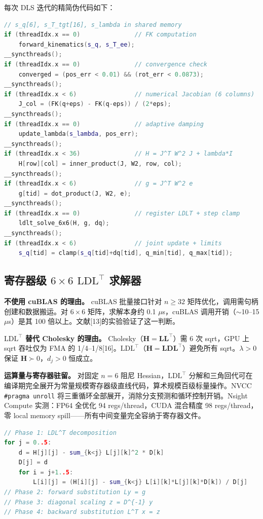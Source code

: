 \documentclass[twocolumn,a4paper,10pt]{ctexart}
\begin{document}
每次 DLS 迭代的精简伪代码如下：

\begin{lstlisting}[language=C++, caption={DLS单次迭代伪代码（per-block，128线程）}]
// s_q[6], s_T_tgt[16], s_lambda in shared memory
if (threadIdx.x == 0)               // FK computation
    forward_kinematics(s_q, s_T_ee);
__syncthreads();
if (threadIdx.x == 0)               // convergence check
    converged = (pos_err < 0.01) && (rot_err < 0.0873);
__syncthreads();
if (threadIdx.x < 6)                // numerical Jacobian (6 columns)
    J_col = (FK(q+eps) - FK(q-eps)) / (2*eps);
__syncthreads();
if (threadIdx.x == 0)               // adaptive damping
    update_lambda(s_lambda, pos_err);
__syncthreads();
if (threadIdx.x < 36)               // H = J^T W^2 J + lambda*I
    H[row][col] = inner_product(J, W2, row, col);
__syncthreads();
if (threadIdx.x < 6)                // g = J^T W^2 e
    g[tid] = dot_product(J, W2, e);
__syncthreads();
if (threadIdx.x == 0)               // register LDLT + step clamp
    ldlt_solve_6x6(H, g, dq);
__syncthreads();
if (threadIdx.x < 6)                // joint update + limits
    s_q[tid] = clamp(s_q[tid]+dq[tid], q_min[tid], q_max[tid]);
\end{lstlisting}

\subsection{寄存器级 $6\times6$ $\mathrm{LDL}^\top$ 求解器}

{\bfseries 不使用 cuBLAS 的理由。} cuBLAS 批量接口针对 $n\ge32$ 矩阵优化，调用需句柄创建和数据搬运。对 $6\times6$ 矩阵，求解本身约 0.1 $\mu$s，cuBLAS 调用开销（$\sim$10--15 $\mu$s）是其 100 倍以上。文献[13]的实验验证了这一判断。

{\bfseries $\mathrm{LDL}^\top$ 替代 Cholesky 的理由。} Cholesky（$\mathbf{H}=\mathbf{L}\mathbf{L}^\top$）需 6 次 sqrt，GPU 上 sqrt 吞吐仅为 FMA 的 1/4--1/8[16]。$\mathrm{LDL}^\top$（$\mathbf{H}=\mathbf{L}\mathbf{D}\mathbf{L}^\top$）避免所有 sqrt。$\lambda>0$ 保证 $\mathbf{H}\succ0$，$d_j>0$ 恒成立。

{\bfseries 运算量与寄存器驻留。} 对固定 $n=6$ 阻尼 Hessian，$\mathrm{LDL}^\top$ 分解和三角回代可在编译期完全展开为常量规模寄存器级直线代码，算术规模百级标量操作。NVCC \texttt{\#pragma unroll} 将三重循环全部展开，消除分支预测和循环控制开销。Nsight Compute 实测：FP64 全优化 94 regs/thread，CUDA 混合精度 98 regs/thread，零 local memory spill——所有中间变量完全容纳于寄存器文件。

\begin{lstlisting}[language=C++, caption={LDLT求解器结构（编译期完全展开）}]
// Phase 1: LDL^T decomposition
for j = 0..5:
    d = H[j][j] - sum_{k<j} L[j][k]^2 * D[k]
    D[j] = d
    for i = j+1..5:
        L[i][j] = (H[i][j] - sum_{k<j} L[i][k]*L[j][k]*D[k]) / D[j]
// Phase 2: forward substitution Ly = g
// Phase 3: diagonal scaling z = D^{-1} y
// Phase 4: backward substitution L^T x = z
\end{lstlisting}
\end{document}
